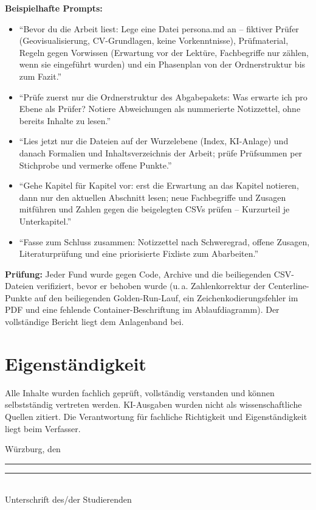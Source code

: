 \documentclass[12pt,a4paper]{article}
\begin{document}
\textbf{Beispielhafte Prompts:}
\begin{itemize}
  \item \enquote{Bevor du die Arbeit liest: Lege eine Datei persona.md an --
        fiktiver Prüfer (Geovisualisierung, CV-Grundlagen, keine
        Vorkenntnisse), Prüfmaterial, Regeln gegen Vorwissen (Erwartung vor
        der Lektüre, Fachbegriffe nur zählen, wenn sie eingeführt wurden) und
        ein Phasenplan von der Ordnerstruktur bis zum Fazit.}
  \item \enquote{Prüfe zuerst nur die Ordnerstruktur des Abgabepakets: Was
        erwarte ich pro Ebene als Prüfer? Notiere Abweichungen als
        nummerierte Notizzettel, ohne bereits Inhalte zu lesen.}
  \item \enquote{Lies jetzt nur die Dateien auf der Wurzelebene (Index,
        KI-Anlage) und danach Formalien und Inhaltsverzeichnis der Arbeit;
        prüfe Prüfsummen per Stichprobe und vermerke offene Punkte.}
  \item \enquote{Gehe Kapitel für Kapitel vor: erst die Erwartung an das
        Kapitel notieren, dann nur den aktuellen Abschnitt lesen; neue
        Fachbegriffe und Zusagen mitführen und Zahlen gegen die beigelegten
        CSVs prüfen -- Kurzurteil je Unterkapitel.}
  \item \enquote{Fasse zum Schluss zusammen: Notizzettel nach Schweregrad,
        offene Zusagen, Literaturprüfung und eine priorisierte Fixliste zum
        Abarbeiten.}
\end{itemize}

\textbf{Prüfung:} Jeder Fund wurde gegen Code, Archive und die beiliegenden
CSV-Dateien verifiziert, bevor er behoben wurde (u.\,a. Zahlenkorrektur der
Centerline-Punkte auf den beiliegenden Golden-Run-Lauf, ein
Zeichenkodierungsfehler im PDF und eine fehlende Container-Beschriftung im
Ablaufdiagramm). Der vollständige Bericht liegt dem Anlagenband bei.

\section{Eigenständigkeit}

Alle Inhalte wurden fachlich geprüft, vollständig verstanden und können selbstständig vertreten werden. KI-Ausgaben wurden nicht als wissenschaftliche Quellen zitiert. Die Verantwortung für fachliche Richtigkeit und Eigenständigkeit liegt beim Verfasser.

\vfill
\noindent Würzburg, den \rule{4cm}{0.4pt}\hfill
\rule{6cm}{0.4pt}\\
\hfill Unterschrift des/der Studierenden
\end{document}

